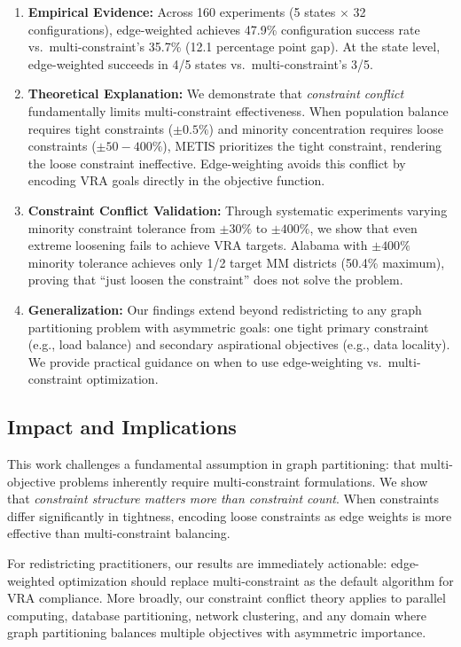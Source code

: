 \begin{enumerate}
    \item \textbf{Empirical Evidence:} Across 160 experiments (5 states $\times$ 32 configurations), edge-weighted achieves 47.9\% configuration success rate vs.~multi-constraint's 35.7\% (12.1 percentage point gap). At the state level, edge-weighted succeeds in 4/5 states vs.~multi-constraint's 3/5.

    \item \textbf{Theoretical Explanation:} We demonstrate that \textit{constraint conflict} fundamentally limits multi-constraint effectiveness. When population balance requires tight constraints ($\pm0.5\%$) and minority concentration requires loose constraints ($\pm50-400\%$), METIS prioritizes the tight constraint, rendering the loose constraint ineffective. Edge-weighting avoids this conflict by encoding VRA goals directly in the objective function.

    \item \textbf{Constraint Conflict Validation:} Through systematic experiments varying minority constraint tolerance from $\pm30\%$ to $\pm400\%$, we show that even extreme loosening fails to achieve VRA targets. Alabama with $\pm400\%$ minority tolerance achieves only 1/2 target MM districts (50.4\% maximum), proving that ``just loosen the constraint'' does not solve the problem.

    \item \textbf{Generalization:} Our findings extend beyond redistricting to any graph partitioning problem with asymmetric goals: one tight primary constraint (e.g., load balance) and secondary aspirational objectives (e.g., data locality). We provide practical guidance on when to use edge-weighting vs.~multi-constraint optimization.
\end{enumerate}

\subsection{Impact and Implications}

This work challenges a fundamental assumption in graph partitioning: that multi-objective problems inherently require multi-constraint formulations. We show that \textit{constraint structure matters more than constraint count}. When constraints differ significantly in tightness, encoding loose constraints as edge weights is more effective than multi-constraint balancing.

For redistricting practitioners, our results are immediately actionable: edge-weighted optimization should replace multi-constraint as the default algorithm for VRA compliance. More broadly, our constraint conflict theory applies to parallel computing, database partitioning, network clustering, and any domain where graph partitioning balances multiple objectives with asymmetric importance.

